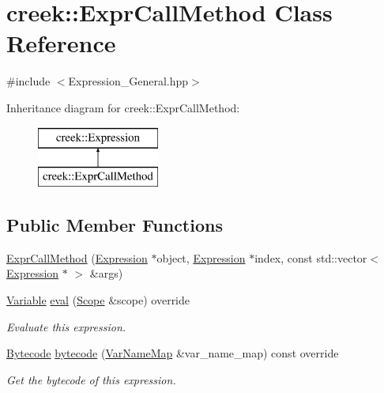 \hypertarget{classcreek_1_1_expr_call_method}{}\section{creek\+:\+:Expr\+Call\+Method Class Reference}
\label{classcreek_1_1_expr_call_method}


{\ttfamily \#include $<$Expression\+\_\+\+General.\+hpp$>$}

Inheritance diagram for creek\+:\+:Expr\+Call\+Method\+:\begin{figure}[H]
\begin{center}
\leavevmode
\includegraphics[height=2.000000cm]{classcreek_1_1_expr_call_method}
\end{center}
\end{figure}
\subsection*{Public Member Functions}
\begin{DoxyCompactItemize}
\item 
\hyperlink{classcreek_1_1_expr_call_method_a0f708872abeed455e930558d01b6f8b3}{Expr\+Call\+Method} (\hyperlink{classcreek_1_1_expression}{Expression} $\ast$object, \hyperlink{classcreek_1_1_expression}{Expression} $\ast$index, const std\+::vector$<$ \hyperlink{classcreek_1_1_expression}{Expression} $\ast$ $>$ \&args)
\item 
\hyperlink{classcreek_1_1_variable}{Variable} \hyperlink{classcreek_1_1_expr_call_method_a8f3ba74247e00f1b531fd1f4415ec73f}{eval} (\hyperlink{classcreek_1_1_scope}{Scope} \&scope) override
\begin{DoxyCompactList}\small\item\em Evaluate this expression. \end{DoxyCompactList}\item 
\hyperlink{classcreek_1_1_bytecode}{Bytecode} \hyperlink{classcreek_1_1_expr_call_method_a9e3e234e95e46054546b2a3f14f64f7f}{bytecode} (\hyperlink{classcreek_1_1_var_name_map}{Var\+Name\+Map} \&var\+\_\+name\+\_\+map) const  override\hypertarget{classcreek_1_1_expr_call_method_a9e3e234e95e46054546b2a3f14f64f7f}{}\label{classcreek_1_1_expr_call_method_a9e3e234e95e46054546b2a3f14f64f7f}

\begin{DoxyCompactList}\small\item\em Get the bytecode of this expression. \end{DoxyCompactList}\end{DoxyCompactItemize}


